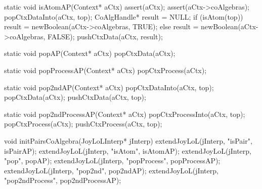 static void isAtomAP(Context* aCtx) {
  assert(aCtx);
  assert(aCtx->coAlgebras);
  popCtxDataInto(aCtx, top);
  CoAlgHandle* result = NULL;
  if (isAtom(top)) result = newBoolean(aCtx->coAlgebras, TRUE);
  else             result = newBoolean(aCtx->coAlgebras, FALSE);
  pushCtxData(aCtx, result);
}

static void popAP(Context* aCtx) {
  popCtxData(aCtx);
}

static void popProcessAP(Context* aCtx) {
  popCtxProcess(aCtx);
}

static void pop2ndAP(Context* aCtx) {
  popCtxDataInto(aCtx, top);
  popCtxData(aCtx);
  pushCtxData(aCtx, top);
}

static void pop2ndProcessAP(Context* aCtx) {
  popCtxProcessInto(aCtx, top);
  popCtxProcess(aCtx);
  pushCtxProcess(aCtx, top);
}

void initPairsCoAlgebra(JoyLoLInterp* jInterp) {
  extendJoyLoL(jInterp, "isPair",        isPairAP);
  extendJoyLoL(jInterp, "isAtom",        isAtomAP);
  extendJoyLoL(jInterp, "pop",           popAP);
  extendJoyLoL(jInterp, "popProcess",    popProcessAP);
  extendJoyLoL(jInterp, "pop2nd",        pop2ndAP);
  extendJoyLoL(jInterp, "pop2ndProcess", pop2ndProcessAP);
}
\stopCCode

\stopTestSuite
